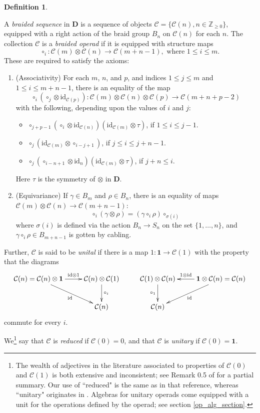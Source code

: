 \documentclass[12pt]{article}
\newcommand{\field}[1]{\mathbb{#1}}
\newcommand{\Z}{\field{Z}}
\newcommand{\CC} {\mathcal{C}}
\newcommand{\one} {\mathbf{1}}
\newcommand{\bD} {\mathbf{D}}
\newcommand{\id}{\mbox{id}}
\theoremstyle{plain}
\theoremstyle{definition}
\newtheorem{defn}[thm]{Definition}
\theoremstyle{remark}
\begin{document}
\begin{defn} \label{brop_defn}

A \emph{braided sequence} in $\bD$ is a sequence of objects $\CC = \{\CC(n), n \in \Z_{\geq 0}\}$, equipped with a right action of the braid group $B_n$ on $\CC(n)$ for each $n$.  The collection $\CC$ is a \emph{braided operad} if it is equipped with structure maps
%
$$\circ_i: \CC(m) \otimes \CC(n) \to \CC(m+n-1), \mbox{ where } 1 \leq i\leq m.$$
%
These are required to satisfy the axioms:

\begin{enumerate}

\item (Associativity) For each $m$, $n$, and $p$, and indices $1 \leq j \leq m$ and $1 \leq i \leq m+n-1$, there is an equality of the map 
%
$$\circ_i(\circ_j \otimes \id_{\CC(p)}): \CC(m) \otimes \CC(n) \otimes \CC(p) \to \CC(m+n+p-2)$$
%
with the following, depending upon the values of $i$ and $j$:
\begin{itemize}
\item $\circ_{j+p-1}(\circ_i \otimes \id_{\CC(n)}) (\id_{\CC(m)} \otimes \tau)$, if $1 \leq i \leq j-1$.
\item $\circ_j(\id_{\CC(m)} \otimes \circ_{i-j+1})$, if $j \leq i \leq j+n-1$.
\item $\circ_j(\circ_{i-n+1} \otimes \id_{n}) (\id_{\CC(m)} \otimes \tau)$, if $j+n \leq i$.
\end{itemize}
%
Here $\tau$ is the symmetry of $\otimes$ in $\bD$.

\item (Equivariance) If $\gamma \in B_m$ and $\rho \in B_n$, there is an equality of maps $\CC(m) \otimes \CC(n) \to \CC(m+n-1)$:
%
$$\circ_i (\gamma \otimes \rho) = (\gamma \circ_i \rho) \circ_{\sigma(i)}$$
%
where $\sigma(i)$ is defined via the action $B_n \to S_n$ on the set $\{1, \dots, n\}$, and $\gamma \circ_i \rho \in B_{m+n-1}$ is gotten by cabling.

\end{enumerate}

Further, $\CC$ is said to be \emph{unital} if there is a map $1:\one \to \CC(1)$ with the property that the diagrams
%
$$\xymatrix{
\CC(n) = \CC(n) \otimes \one \ar[dr]_-{\mathrm{id}} \ar[r]^-{\mathrm{id} \otimes 1} & \CC(n) \otimes \CC(1) \ar[d]^-{\circ_i} & \CC(1) \otimes \CC(n) \ar[d]_-{\circ_1} & \ar[dl]^-{\mathrm{id}} \one \otimes \CC(n) = \CC(n) \ar[l]_-{1 \otimes \mathrm{id}} \\
 & \CC(n) & \CC(n) & }$$
%
commute for every $i$.  

We\footnote{The wealth of adjectives in the literature associated to properties of $\CC(0)$ and $\CC(1)$ is both extensive and inconsistent; see Remark 0.5 of \cite{may-zhang-zou} for a partial summary.  Our use of ``reduced" is the same as in that reference, whereas ``unitary" originates in \cite{fresse}.  Algebras for unitary operads come equipped with a unit for the operations defined by the operad; see section \ref{op_alg_section}.} say that $\CC$ is \emph{reduced} if $\CC(0) = 0$, and that $\CC$ is \emph{unitary} if $\CC(0) = \one$. 

\end{defn}
\end{document}
